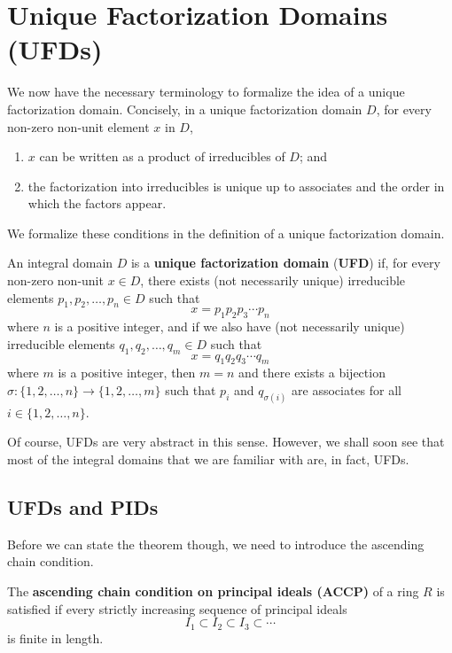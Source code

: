 \section{Unique Factorization Domains (UFDs)}
We now have the necessary terminology to formalize the idea of a unique factorization domain. Concisely, in a unique factorization domain $D$, for every non-zero non-unit element $x$ in $D$,
\begin{enumerate}
    \item $x$ can be written as a product of irreducibles of $D$; and
    \item the factorization into irreducibles is unique up to associates and the order in which the factors appear.
\end{enumerate}

We formalize these conditions in the definition of a unique factorization domain.

\begin{definition}
    An integral domain $D$ is a \textbf{unique factorization domain} (\textbf{UFD}) if, for every non-zero non-unit $x \in D$, there exists (not necessarily unique) irreducible elements $p_1, p_2, \dots, p_n \in D$ such that
    \[
        x = p_1p_2p_3\cdots p_n
    \]
    where $n$ is a positive integer, and if we also have (not necessarily unique) irreducible elements $q_1, q_2, \dots, q_m \in D$ such that
    \[
        x = q_1q_2q_3\cdots q_m
    \]
    where $m$ is a positive integer, then $m = n$ and there exists a bijection $\sigma: \{1,2,\dots,n\} \to \{1,2,\dots,m\}$ such that $p_i$ and $q_{\sigma(i)}$ are associates for all $i \in \{1,2,\dots,n\}$.
\end{definition}

Of course, UFDs are very abstract in this sense. However, we shall soon see that most of the integral domains that we are familiar with are, in fact, UFDs.

\subsection{UFDs and PIDs}
Before we can state the theorem though, we need to introduce the ascending chain condition.

\begin{definition}
    The \textbf{ascending chain condition on principal ideals (ACCP)} of a ring $R$ is satisfied if every strictly increasing sequence of principal ideals 
    \[
        I_1 \subset I_2 \subset I_3 \subset \cdots
    \]
    is finite in length.
\end{definition}

